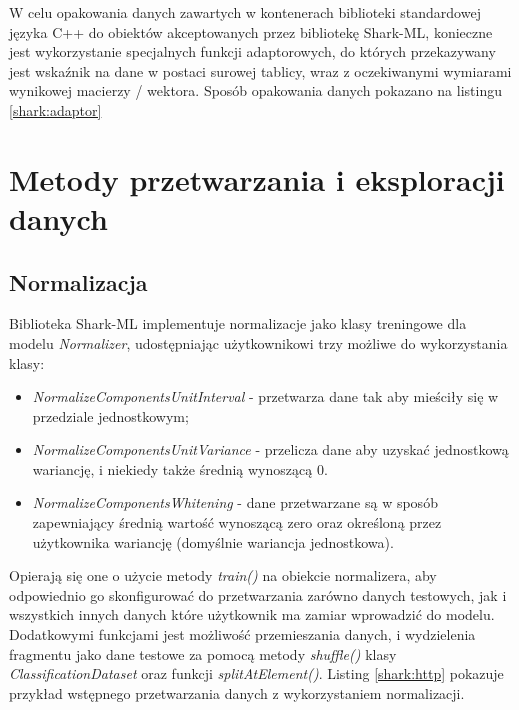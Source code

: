 \newpage
{}

W celu opakowania danych zawartych w kontenerach biblioteki standardowej języka C++ do obiektów akceptowanych przez bibliotekę Shark-ML, konieczne jest wykorzystanie specjalnych funkcji adaptorowych, do których przekazywany jest wskaźnik na dane w postaci surowej tablicy, wraz z oczekiwanymi wymiarami wynikowej macierzy / wektora. Sposób opakowania danych pokazano na listingu \ref{shark:adaptor}


\section{Metody przetwarzania i eksploracji danych}

\subsection{Normalizacja}

Biblioteka Shark-ML implementuje normalizacje jako klasy treningowe dla modelu \textit{Normalizer}, udostępniając użytkownikowi trzy możliwe do wykorzystania klasy:

\begin{itemize}
	\item \textit{NormalizeComponentsUnitInterval} - przetwarza dane tak aby mieściły się w przedziale jednostkowym;
	\item \textit{NormalizeComponentsUnitVariance} - przelicza dane aby uzyskać jednostkową wariancję, i niekiedy także średnią wynoszącą 0.
	\item \textit{NormalizeComponentsWhitening} - dane przetwarzane są w sposób zapewniający średnią wartość wynoszącą zero oraz określoną przez użytkownika wariancję (domyślnie wariancja jednostkowa).
\end{itemize}

Opierają się one o użycie metody \textit{train()} na obiekcie normalizera, aby odpowiednio go skonfigurować do przetwarzania zarówno danych testowych, jak i wszystkich innych danych które użytkownik ma zamiar wprowadzić do modelu. Dodatkowymi funkcjami jest możliwość przemieszania danych, i wydzielenia fragmentu jako dane testowe za pomocą metody \textit{shuffle()} klasy \textit{ClassificationDataset} oraz funkcji \textit{splitAtElement()}. Listing \ref{shark:http} pokazuje przykład wstępnego przetwarzania danych z wykorzystaniem normalizacji.

